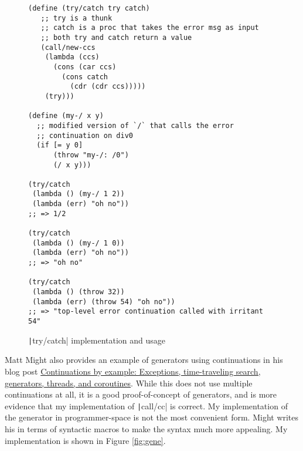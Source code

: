 \documentclass[]{article}
\begin{document}
\begin{figure}
  \centering
\begin{verbatim}
(define (try/catch try catch)
   ;; try is a thunk
   ;; catch is a proc that takes the error msg as input
   ;; both try and catch return a value
   (call/new-ccs
    (lambda (ccs)
      (cons (car ccs)
        (cons catch
	      (cdr (cdr ccs)))))
    (try)))

(define (my-/ x y)
  ;; modified version of `/` that calls the error
  ;; continuation on div0
  (if [= y 0]
      (throw "my-/: /0")
      (/ x y)))

(try/catch
 (lambda () (my-/ 1 2))
 (lambda (err) "oh no"))
;; => 1/2

(try/catch
 (lambda () (my-/ 1 0))
 (lambda (err) "oh no"))
;; => "oh no"

(try/catch
 (lambda () (throw 32))
 (lambda (err) (throw 54) "oh no"))
;; => "top-level error continuation called with irritant 54"
\end{verbatim}
  \caption{\texttt|try/catch| implementation and usage}
  \label{fig:tryc}
\end{figure}

Matt Might also provides an example of generators using continuations in his blog post \href{https://matt.might.net/articles/programming-with-continuations--exceptions-backtracking-search-threads-generators-coroutines/}{Continuations by example: Exceptions, time-traveling search, generators, threads, and coroutines}. While this does not use multiple continuations at all, it is a good proof-of-concept of generators, and is more evidence that my implementation of \texttt|call/cc| is correct. My implementation of the generator in programmer-space is not the most convenient form. Might writes his in terms of syntactic macros to make the syntax much more appealing. My implementation is shown in Figure \ref{fig:gene}.
\end{document}
